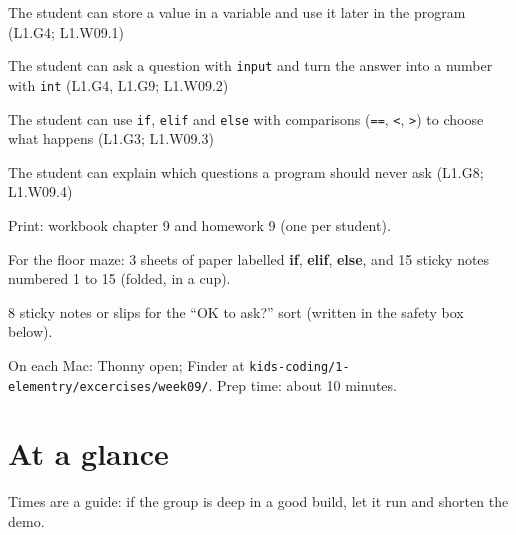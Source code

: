 
\begin{objectives}
  \item The student can store a value in a variable and use it later in the program (L1.G4; L1.W09.1)
  \item The student can ask a question with \texttt{input} and turn the answer into a number with \texttt{int} (L1.G4, L1.G9; L1.W09.2)
  \item The student can use \texttt{if}, \texttt{elif} and \texttt{else} with comparisons (\texttt{==}, \texttt{<}, \texttt{>}) to choose what happens (L1.G3; L1.W09.3)
  \item The student can explain which questions a program should never ask (L1.G8; L1.W09.4)
\end{objectives}

\begin{materials}
  \item Print: workbook chapter 9 and homework 9 (one per student).
  \item For the floor maze: 3 sheets of paper labelled \textbf{if}, \textbf{elif}, \textbf{else}, and 15 sticky notes numbered 1 to 15 (folded, in a cup).
  \item 8 sticky notes or slips for the \enquote{OK to ask?} sort (written in the safety box below).
  \item On each Mac: Thonny open; Finder at \texttt{kids-coding/1-elementry/excercises/week09/}. Prep time: about 10 minutes.
\end{materials}

\section{At a glance}
Times are a guide: if the group is deep in a good build, let it run and shorten the demo.
\begin{timeplan}
\end{timeplan}

